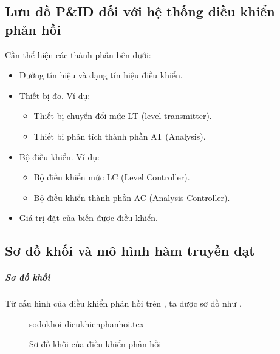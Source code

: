 \subsection{Lưu đồ P\&ID đối với hệ thống điều khiển phản hồi}
    Cần thể hiện các thành phần bên dưới:
        \begin{itemize}
            \item Đường tín hiệu và dạng tín hiệu điều khiển.
            \item Thiết bị đo. Ví dụ:
                \begin{itemize}
                    \item Thiết bị chuyển đổi mức LT (level transmitter).
                    \item Thiết bị phân tích thành phần AT (Analysis).
                \end{itemize}
            \item Bộ điều khiển. Ví dụ:
                \begin{itemize}
                    \item Bộ điều khiển mức LC (Level Controller).
                    \item Bộ điều khiển thành phần AC (Analysis Controller).
                \end{itemize}
            \item Giá trị đặt của biến được điều khiển.
        \end{itemize}

\subsection{Sơ đồ khối và mô hình hàm truyền đạt}
    \subparagraph{Sơ đồ khối} Từ cấu hình của điều khiển phản hồi trên \fig{\ref{Fig:cauhinhchuan-dieukhienphanhoi}}, ta được sơ đồ như \fig{\ref{Fig:sodokhoi-dieukhienphanhoi}}.
        \begin{figure}[htp]
            \begin{center}
                {sodokhoi-dieukhienphanhoi.tex}
            \end{center}
            \caption{Sơ đồ khối của điều khiển phản hồi} \label{Fig:sodokhoi-dieukhienphanhoi}
        \end{figure}

